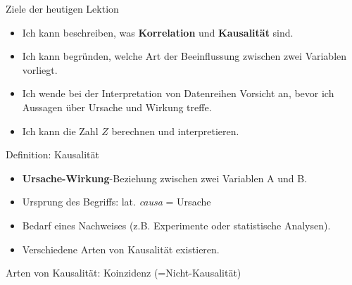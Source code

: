 \begin{frame}[fragile]{Ziele der heutigen Lektion}
    \begin{itemize}[<+->]
        \item \faSquare{} Ich kann beschreiben, was \textbf{Korrelation} und \textbf{Kausalität} sind.
        \item \faSquare{} Ich kann begründen, welche Art der Beeinflussung zwischen zwei Variablen vorliegt.
        \item \faSquare{} Ich wende bei der Interpretation von Datenreihen Vorsicht an, bevor ich Aussagen über Ursache und Wirkung treffe.
        \item \faSquare{} Ich kann die Zahl \( Z \) berechnen und interpretieren.
    \end{itemize}
\end{frame}

\begin{frame}{Definition: Kausalität}
    \begin{mydefinition}[Kausalität]
    \begin{itemize}[<+->]
        \item \textbf{Ursache-Wirkung}-Beziehung zwischen zwei Variablen A und B.
        \item Ursprung des Begriffs: lat. \textit{causa} = Ursache
        \item Bedarf eines Nachweises (z.B. Experimente oder statistische Analysen).
        \item Verschiedene Arten von Kausalität existieren.
    \end{itemize}
    \end{mydefinition}
\end{frame}

\begin{frame}{Arten von Kausalität: Koinzidenz (=Nicht-Kausalität)}
    \begin{center}
    \end{center}
\end{frame}

